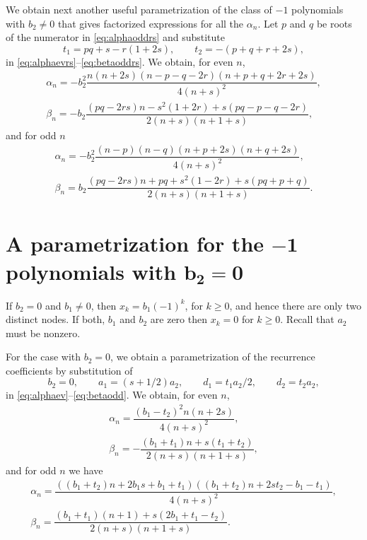 \documentclass[pdftex]{sigma}
\numberwithin{equation}{section}
\begin{document}
 We obtain next another useful parametrization of the class of $-1$ polynomials with $b_2 \ne 0$ that gives factorized expressions for all the $\alpha_n$.
 Let $p$ and $q$ be roots of the numerator in \eqref{eq:alphaoddrs} and substitute
\[ t_1=p q +s -r ( 1+ 2s), \qquad t_2=-(p+q+r+2s), \]
 in \eqref{eq:alphaevrs}--\eqref{eq:betaoddrs}.
 We obtain, for even $n$,
\begin{gather*}%
\alpha_n=-b_2^2\dfrac{n ( n+ 2s) (n-p-q- 2 r) ( n+p+q+2r+ 2s)}{4(n+s)^2},
\\ %
\beta_n=- b_2\dfrac{(pq-2 rs) n - s^2 ( 1+2r) +s (pq-p-q-2r)}{2 (n+s) ( n+1+s)},
 \end{gather*}
 and for odd $n$
\begin{gather*}%
	\alpha_n=-b_2^2\dfrac{(n-p) (n-q) ( n+p+ 2s) (n+q + 2 s) }{4(n+s)^2},
\\ %
\beta_n= b_2\dfrac{(pq-2 rs) n + p q+ s^2 ( 1-2r) +s (pq+p+q)}{2 (n+s) ( n+1+s)}.
 \end{gather*}

 \section[A parametrization for the -1 polynomials with b\_2=0]{A parametrization for the $\boldsymbol{-1}$ polynomials with $\boldsymbol{b_2=0}$}\label{section5}

 If $b_2=0$ and $b_1 \ne 0$, then $x_k= b_1 (-1)^k$, for $k\ge 0$, and hence there are only two distinct nodes. If both, $b_1$ and $b_2$ are zero then $x_k=0$ for $k\ge 0$. Recall that $a_2$ must be nonzero.

 For the case with $b_2=0$, we obtain a parametrization of the recurrence coefficients by substitution of
 \[ b_2=0,\qquad a_1=(s+ 1/2) a_2, \qquad d_1=t_1 a_2/2, \qquad d_2= t_2 a_2, \]
 in \eqref{eq:alphaev}--\eqref{eq:betaodd}. We obtain, for even $n$,
\begin{gather}\label{eq:alphaevb2}
\alpha_n=\dfrac{(b_1-t_2)^2 n ( n+2 s)}{4 (n+s)^2},
\\
\label{eq:betaevb2}
\beta_n=-\dfrac{(b_1+ t_1) n + s ( t_1+ t_2)}{2(n+s) ( n+1+s)},
\end{gather}
and for odd $n$ we have
\begin{gather}\label{eq:alphaoddb2}
	\alpha_n=\dfrac{((b_1+t_2) n + 2 b_1 s+ b_1+t_1)( (b_1+ t_2)n+2 s t_2 - b_1 - t_1) }{4 (n+s)^2},
\\\label{eq:betaoddb2}
	\beta_n=\dfrac{ (b_1+ t_1) (n+1) + s(2 b_1+t_1-t_2) }{2(n+s) ( n+1+s)}.
\end{gather}
\end{document}

